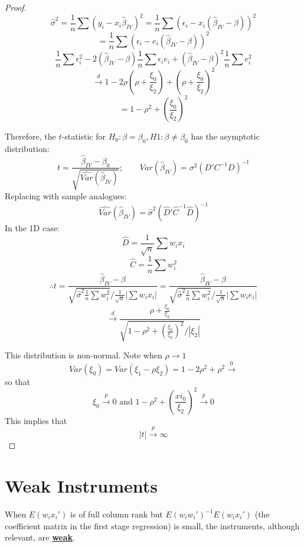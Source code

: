 \documentclass[DIV=14,titlepage=false]{scrreprt}
\begin{document}
\begin{proof}
    \[\hat \sigma^2=\frac{1}{n}\sum(y_i-x_i\hat\beta_{IV})^2=\frac{1}{n}\sum (\epsilon_i-x_i(\hat\beta_{IV}-\beta))^2\]
    \[=\frac{1}{n}\sum(\epsilon_i-e_i(\hat\beta_{IV}-\beta))^2\]
    \[\frac{1}{n}\sum \epsilon_i^2 - 2(\hat\beta_{IV}-\beta)\frac{1}{n}\sum \epsilon_ie_i+(\hat\beta_{IV}-\beta)^2\frac{1}{n}\sum e_i^2\]
    \[\xrightarrow{d}1-2\rho\left(\rho+\frac{\xi_0}{\xi_2}\right)+\left(\rho+\frac{\xi_0}{\xi_2}\right)^2\]
    \[=1-\rho^2+\left(\frac{\xi_0}{\xi_2}\right)^2\]

Therefore, the \(t\)-statistic for \(H_0: \beta=\beta_0, H1:\beta\neq\beta_0\) has the asymptotic distribution:
\[t=\frac{\hat \beta_{IV}-\beta_0}{\sqrt{\hat{Var}(\hat \beta_{IV})}}; \qquad {Var}(\hat \beta_{IV})=\sigma^2(D'C^{-1}D)^{-1}\]
Replacing with sample analogues:
\[\hat{Var}(\hat \beta_{IV})=\hat\sigma^2(\hat D'\hat C^{-1}\hat D)^{-1}\]
In the 1D case:
\[\hat D=\frac{1}{\sqrt{n}}\sum w_ix_i\]
\[\hat C=\frac{1}{n}\sum w_i^2\]
\[\therefore t=\frac{\hat \beta_{IV}-\beta}{\sqrt{\hat\sigma^2\frac{1}{n}\sum w_i^2}/\frac{1}{\sqrt{n}}|\sum w_ix_i|}=\frac{\hat \beta_{IV}-\beta}{\sqrt{\hat \sigma^2\frac{1}{n}\sum w_i^2}/\frac{1}{\sqrt{n}}|\sum w_ie_i|}\]
\[\xrightarrow{d}\frac{\rho+\frac{\xi_0}{\xi_2}}{\sqrt{1-\rho^2+\left(\frac{\xi_0}{\xi_2}\right)^2}/|\xi_2|}\]

This distribution is non-normal.
Note when \(\rho \rightarrow 1\)
\[Var(\xi_0)=Var(\xi_1-\rho\xi_2)=1-2\rho^2+\rho^2\xrightarrow 0\]
so that
\[\xi_0\xrightarrow{p}0 \text{ and } 1-\rho^2+(\frac{xi_0}{\xi_2})^2\xrightarrow{p}0\]
This implies that \[|t|\xrightarrow{p}\infty\]
\end{proof}

\section{Weak Instruments}
When \(E(w_ix_i')\) is of full column rank but \(E(w_iw_i')^{-1}E(w_ix_i')\) (the coefficient matrix in the first stage regression) is small, the instruments, although relevant, are \textbf{\underline{weak}}.
\end{document}
